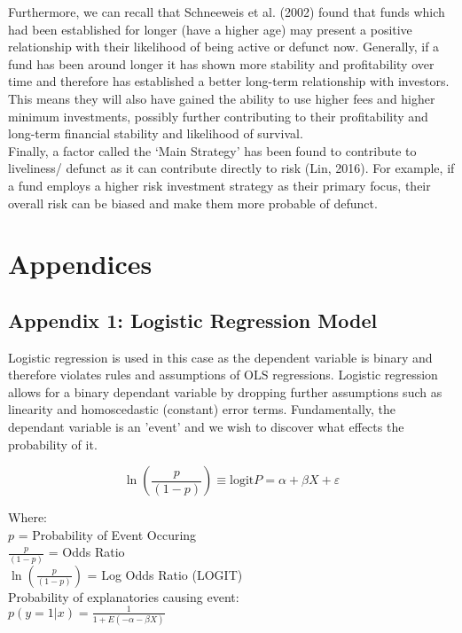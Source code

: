 \documentclass[11pt, english]{article}
\begin{document}
	Furthermore, we can recall that Schneeweis et al. (2002) found that funds which had been established for longer (have a higher age) may present a positive relationship with their likelihood of being active or defunct now. Generally, if a fund has been around longer it has shown more stability and profitability over time and therefore has established a better long-term relationship with investors. This means they will also have gained the ability to use higher fees and higher minimum investments, possibly further contributing to their profitability and long-term financial stability and likelihood of survival.\\

	Finally, a factor called the `Main Strategy' has been found to contribute to liveliness/ defunct as it can contribute directly to risk (Lin, 2016). For example, if a fund employs a higher risk investment strategy as their primary focus, their overall risk can be biased and make them more probable of defunct.

\newpage

\section*{Appendices}

	\subsection*{Appendix 1: Logistic Regression Model}

	Logistic regression is used in this case as the dependent variable is binary and therefore violates rules and assumptions of OLS regressions. Logistic regression allows for a binary dependant variable by dropping further assumptions such as linearity and homoscedastic (constant) error terms. Fundamentally, the dependant variable is an 'event' and we wish to discover what effects the probability of it.

	$$\ln\left(\frac{p}{(1-p)}\right)\equiv\mathrm{logit}P=\alpha+\beta X+\varepsilon$$

	Where:\\
	$p$ = Probability of Event Occuring\\
	$\frac{p}{(1-p)}$ = Odds Ratio\\
	$\ln\left(\frac{p}{(1-p)}\right)$ = Log Odds Ratio (LOGIT)\\

	Probability of explanatories causing event:\\
	$p(y=1|x)=\frac{1}{1+E(-\alpha-\beta X)}$\\
\end{document}
